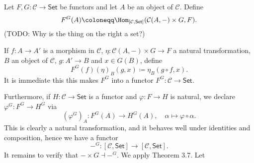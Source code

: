 Let  $F, G\colon \mathcal{C}\to \mathsf{Set}$ be functors and let $A$ be
 an object of $\mathcal{C}$. Define
 \[ F^G(A)\coloneqq \Hom_{[\mathcal{C}, \mathsf{Set}]}(\mathcal{C}(A, {-})\times G, F). \]
(TODO: Why is the thing on the right a set?)

If $f\colon A\to A'$ is a morphism in $\mathcal{C}$, $\eta\colon \mathcal{C}(A, {-})\times G\to F$
a natural transformation, $B$ an object of $\mathcal{C}$, $g\colon A'\to B$ and
$x \in G(B)$, define \[ F^G(f)(\eta)_B(g, x)\coloneqq \eta_B(g \circ f, x). \]
It
is immediate this this makes $F^G$ into a functor $F^G\colon \mathcal{C} \to \mathsf{Set}$.

Furthermore, if $H\colon \mathcal{C}\to\mathsf{Set}$ is a functor and
$\varphi\colon F\to H$ is natural, we declare $\varphi^G\colon F^G\to H^G$ via
\[ (\varphi^G)_A\colon F^G(A)\to H^G(A),\quad \alpha \mapsto \varphi \circ \alpha. \]
This is clearly a natural transformation, and it behaves well under identities and
composition, hence we have a functor
\[ {-}^G\colon [\mathcal{C}, \mathsf{Set}]\to [\mathcal{C}, \mathsf{Set}]. \]
It remains to verify that ${-}\times G\dashv {-}^G$. We apply Theorem 3.7. Let

